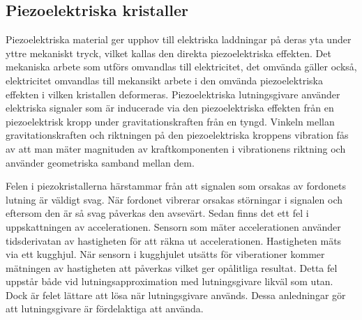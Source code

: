 \subsection{Piezoelektriska kristaller}
Piezoelektriska material ger upphov till
elektriska laddningar på deras yta under yttre mekaniskt tryck,
vilket kallas den direkta piezoelektriska effekten.
Det mekaniska arbete som utförs omvandlas till elektricitet, det omvända gäller
också, elektricitet omvandlas till mekansikt arbete i den omvända
piezoelektriska effekten i vilken kristallen deformeras.
\autocite{electronicdesign2016}
Piezoelektriska lutningsgivare använder elektriska signaler som är
inducerade via den piezoelektriska effekten från en piezoelektrisk kropp
under gravitationskraften från en tyngd.
Vinkeln mellan gravitationskraften och
riktningen på den piezoelektriska kroppens vibration
fås av att man mäter magnituden av kraftkomponenten i vibrationens riktning
och använder geometriska samband mellan dem.
\autocite{chiang00}

Felen i piezokristallerna härstammar från att signalen som orsakas av fordonets
lutning är väldigt svag.
När fordonet vibrerar orsakas störningar i signalen och eftersom den är så svag
påverkas den avsevärt.
Sedan finns det ett fel i uppskattningen av accelerationen.
Sensorn som mäter accelerationen använder tidsderivatan av hastigheten för
att räkna ut accelerationen.
Hastigheten mäts via ett kugghjul.
När sensorn i kugghjulet utsätts för viberationer kommer mätningen av
hastigheten att påverkas vilket ger opålitliga resultat.
Detta fel uppstår både vid lutningsapproximation med lutningsgivare likväl som utan.
Dock är felet lättare att lösa när lutningsgivare används.
Dessa anledningar gör att lutningsgivare är fördelaktiga att använda.

